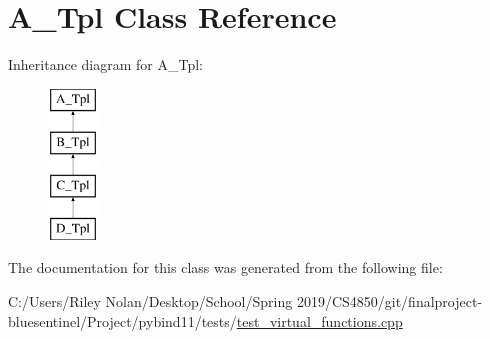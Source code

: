 \hypertarget{class_a___tpl}{}\section{A\+\_\+\+Tpl Class Reference}
\label{class_a___tpl}
Inheritance diagram for A\+\_\+\+Tpl\+:\begin{figure}[H]
\begin{center}
\leavevmode
\includegraphics[height=4.000000cm]{class_a___tpl}
\end{center}
\end{figure}


The documentation for this class was generated from the following file\+:\begin{DoxyCompactItemize}
\item 
C\+:/\+Users/\+Riley Nolan/\+Desktop/\+School/\+Spring 2019/\+C\+S4850/git/finalproject-\/bluesentinel/\+Project/pybind11/tests/\mbox{\hyperlink{test__virtual__functions_8cpp}{test\+\_\+virtual\+\_\+functions.\+cpp}}\end{DoxyCompactItemize}
